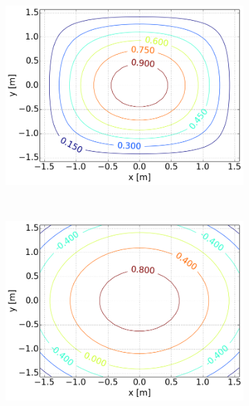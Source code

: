 \begin{figure}[H]
    \centering
    \begin{subfigure}{0.3\textwidth}
        \centering
        \includegraphics[width=\linewidth]{../4a_0_0,5_30.png}
        \caption{}
    \end{subfigure}%
    ~
    \begin{subfigure}{0.3\textwidth}
        \centering
        \includegraphics[width=\linewidth]{../4a_1_0,5_30.png}
        \caption{}
    \end{subfigure}
    ~
    \begin{subfigure}{0.3\textwidth}
        \centering

\end{subfigure}
\end{figure}
